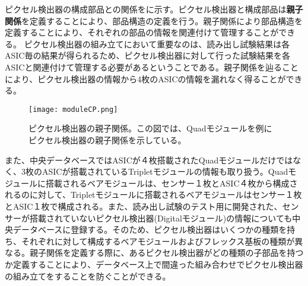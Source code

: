 ピクセル検出器の構成部品との関係をに示す。ピクセル検出器と構成部品は\textbf{親子関係}を定義することにより、部品構造の定義を行う。親子関係により部品構造を定義することにより、それぞれの部品の情報を関連付けて管理することができる。
ピクセル検出器の組み立てにおいて重要なのは、読み出し試験結果は各ASIC毎の結果が得られるため、ピクセル検出器に対して行った試験結果を各ASICと関連付けて管理する必要があるということである。親子関係を辿ることにより、ピクセル検出器の情報から4枚のASICの情報を漏れなく得ることができる。
\begin{figure}[tbp]
  \centering
  \texttt{[image: moduleCP.png]}
  \caption[ピクセル検出器の親子関係]{ピクセル検出器の親子関係。この図では、Quadモジュールを例にピクセル検出器の親子関係を示している。}
  \label{fig:moduleCP}
\end{figure}

また、中央データベースではASICが４枚搭載されたQuadモジュールだけではなく、3枚のASICが搭載されているTripletモジュールの情報も取り扱う。Quadモジュールに搭載されるベアモジュールは、センサー１枚とASIC４枚から構成されるのに対して、Tripletモジュールに搭載されるベアモジュールはセンサー１枚とASIC１枚で構成される。また、読み出し試験のテスト用に開発された、センサーが搭載されていないピクセル検出器(Digitalモジュール)の情報についても中央データベースに登録する。そのため、ピクセル検出器はいくつかの種類を持ち、それぞれに対して構成するベアモジュールおよびフレックス基板の種類が異なる。親子関係を定義する際に、あるピクセル検出器がどの種類の子部品を持つか定義することにより、データベース上で間違った組み合わせでピクセル検出器の組み立てをすることを防ぐことができる。


